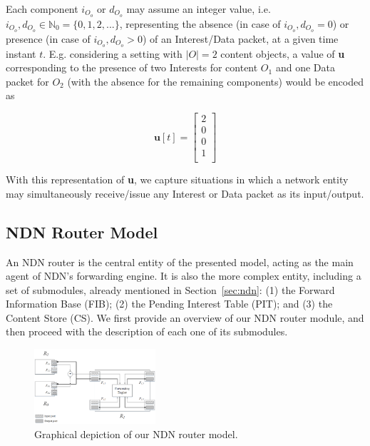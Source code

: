 Each component $i_{O_o}$ or $d_{O_o}$ may assume an integer value, i.e. $i_{O_o}, d_{O_o} \in \mathbb{N}_0 = \{0, 1, 2, ... \}$, 
representing the absence (in case of $i_{O_o}, d_{O_o} = 0$) or presence (in case of $i_{O_o}, d_{O_o} > 0$) of an 
Interest\slash Data packet, at a given time instant $t$. E.g. considering a setting 
with $|O| = 2$ content objects, a value of \textbf{u} corresponding to the presence 
of two Interests for content $O_1$ and one Data packet for $O_2$ (with the absence 
for the remaining components) would be encoded as

\begin{equation}
    \textbf{u}[t] = \begin{bmatrix}     2   \\ 
                                        0   \\ 
                                        0   \\ 
                                        1   \\ \end{bmatrix}
    \label{eq:signal-eg}
\end{equation}\shortvertbreak

With this 
representation of \textbf{u}, we capture situations in which a network 
entity may simultaneously receive\slash issue any Interest or Data packet as 
its input\slash output.

\subsection{NDN Router Model}
\label{subsec:meth-overview}

An NDN router is the central entity of the presented model, acting 
as the main agent of NDN's forwarding engine. It is also the more complex entity, 
including a set of submodules, already 
mentioned in Section~\ref{sec:ndn}: (1) the Forward Information Base (FIB); (2) 
the Pending Interest Table (PIT); and (3) the Content Store (CS). We first 
provide an overview of our NDN router module, and then proceed with the description 
of each one of its submodules.\shortvertbreak

\begin{figure}[h!]

    \centering
    \includegraphics[width=0.40\textwidth]{figures/ndn-router-overview.png}
    \cprotect\caption{Graphical depiction of our NDN router model.}
    \label{fig:ndn-router-overview}

\end{figure}

